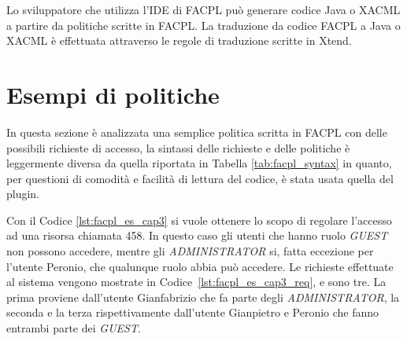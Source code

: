 
Lo sviluppatore che utilizza l'\ac{IDE} di \ac{FACPL} può generare codice Java o \ac{XACML} a partire da politiche scritte in \ac{FACPL}. La traduzione da codice \ac{FACPL} a Java o \ac{XACML} è effettuata attraverso le regole di traduzione scritte in Xtend.

\section{Esempi di politiche} %
\label{sec:esempio_di_politica_con_facpl}
In questa sezione è analizzata una semplice politica scritta in \ac{FACPL} con delle possibili richieste di accesso, la sintassi delle richieste e delle politiche è leggermente diversa da quella riportata in Tabella \ref{tab:facpl_syntax} in quanto, per questioni di comodità e facilità di lettura del codice, è stata usata quella del plugin.\par
 
Con il Codice \ref{lst:facpl_es_cap3} si vuole ottenere lo scopo di regolare l'accesso ad una risorsa chiamata 458. In questo caso gli utenti che hanno ruolo \textit{GUEST} non possono accedere, mentre gli \textit{ADMINISTRATOR} si, fatta eccezione per l'utente Peronio, che qualunque ruolo abbia può accedere.
Le richieste effettuate al sistema vengono mostrate in Codice~\ref{lst:facpl_es_cap3_req}, e sono tre. La prima proviene dall'utente Gianfabrizio che fa parte degli \textit{ADMINISTRATOR}, la seconda e la terza rispettivamente dall'utente Gianpietro e Peronio che fanno entrambi parte dei \textit{GUEST}. 
 

